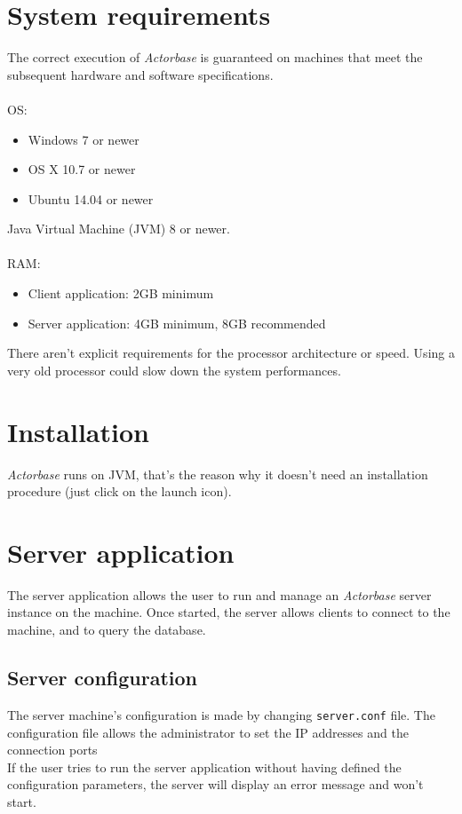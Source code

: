 \documentclass[a4paper]{article}
\begin{document}
	\newpage



	\section{System requirements}	
	The correct execution of \emph{Actorbase} is guaranteed on machines that meet the subsequent hardware and software specifications.
	\\ \\
	OS:
	\begin{itemize}
		\item Windows 7 or newer
		\item OS X 10.7 or newer
		\item Ubuntu 14.04 or newer
	\end{itemize}
	Java Virtual Machine (JVM) 8 or newer.
	\\ \\
	RAM:
	\begin{itemize}
		\item Client application: 2GB minimum
		\item Server application: 4GB minimum, 8GB recommended
	\end{itemize}
	There aren't explicit requirements for the processor architecture or speed. Using a very old processor could slow down the system performances.

	\section{Installation}
	\emph{Actorbase} runs on JVM, that's the reason why it doesn't need an installation procedure (just click on the launch icon). 
	\newpage



	\section{Server application}
	The server application allows the user to run and manage an \emph{Actorbase} server instance on the machine. Once started, the server allows clients to connect to the machine, and to query the database.
	
	\subsection{Server configuration}
	The server machine's configuration is made by changing \texttt{server.conf} file. The configuration file allows the administrator to set the IP addresses and the connection ports
	\\
	If the user tries to run the server application without having defined the configuration parameters, the server will display an error message and won't start.
	
\end{document}
